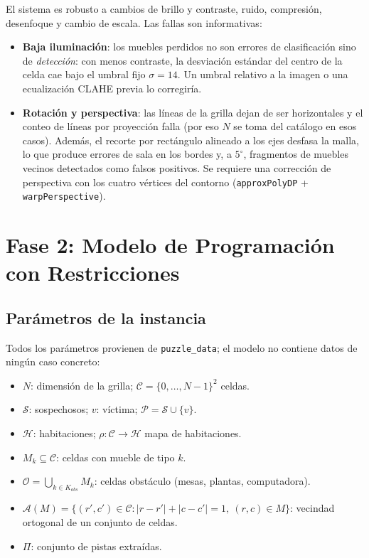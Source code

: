 \documentclass[conference,a4paper]{IEEEtran}
\begin{document}
El sistema es robusto a cambios de brillo y contraste, ruido, compresión, desenfoque y
cambio de escala. Las fallas son informativas:
\begin{itemize}
  \item \textbf{Baja iluminación}: los muebles perdidos no son errores de clasificación
        sino de \emph{detección}: con menos contraste, la desviación estándar del centro de
        la celda cae bajo el umbral fijo $\sigma=14$. Un umbral relativo a la imagen o una
        ecualización CLAHE previa lo corregiría.
  \item \textbf{Rotación y perspectiva}: las líneas de la grilla dejan de ser horizontales y
        el conteo de líneas por proyección falla (por eso $N$ se toma del catálogo en esos
        casos). Además, el recorte por rectángulo alineado a los ejes desfasa la malla, lo
        que produce errores de sala en los bordes y, a $5^\circ$, fragmentos de muebles
        vecinos detectados como falsos positivos. Se requiere una corrección de
        perspectiva con los cuatro vértices del contorno (\texttt{approxPolyDP} +
        \texttt{warpPerspective}).
\end{itemize}

\section{Fase 2: Modelo de Programación con Restricciones}

\subsection{Parámetros de la instancia}
Todos los parámetros provienen de \texttt{puzzle\_data}; el modelo no contiene datos de
ningún caso concreto:
\begin{itemize}
  \item $N$: dimensión de la grilla; $\mathcal{C}=\{0,\dots,N-1\}^2$ celdas.
  \item $\mathcal{S}$: sospechosos; $v$: víctima; $\mathcal{P}=\mathcal{S}\cup\{v\}$.
  \item $\mathcal{H}$: habitaciones; $\rho:\mathcal{C}\to\mathcal{H}$ mapa de habitaciones.
  \item $M_k\subseteq\mathcal{C}$: celdas con mueble de tipo $k$.
  \item $\mathcal{O}=\bigcup_{k\in K_{obs}} M_k$: celdas obstáculo (mesas, plantas,
        computadora).
  \item $\mathcal{A}(M)=\{(r',c')\in\mathcal{C} : |r-r'|+|c-c'|=1,\ (r,c)\in M\}$:
        vecindad ortogonal de un conjunto de celdas.
  \item $\Pi$: conjunto de pistas extraídas.
\end{itemize}
\end{document}
